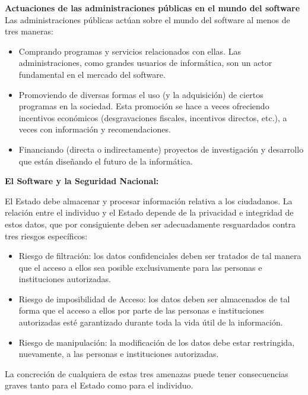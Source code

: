 {\bf Actuaciones de las administraciones públicas en el mundo del software}\newline
Las administraciones públicas actúan sobre el mundo del software al menos de tres maneras:

\begin{itemize}

\item Comprando programas y servicios relacionados con ellas. Las administraciones, como grandes usuarios de informática, son un actor fundamental en el mercado del software.

\item Promoviendo de diversas formas el uso (y la adquisición) de ciertos programas en la sociedad. Esta promoción se hace a veces ofreciendo incentivos económicos (desgravaciones fiscales, incentivos directos, etc.), a veces con información y recomendaciones.

\item Financiando (directa o indirectamente) proyectos de investigación y desarrollo que están diseñando el futuro de la informática.

\end{itemize}

{\bf El Software y la Seguridad Nacional:}\newline
 
 El Estado debe almacenar y procesar información relativa a los ciudadanos. La relación entre el individuo y el Estado depende de la privacidad e integridad de estos datos, que por consiguiente deben ser adecuadamente resguardados contra tres riesgos específicos:
 
\begin{itemize}
\item  Riesgo de filtración: los datos confidenciales deben ser tratados de tal manera que el acceso a ellos sea posible exclusivamente para las personas e instituciones autorizadas.
\item   Riesgo de imposibilidad de Acceso: los datos deben ser almacenados de tal forma que el acceso a ellos por parte de las personas e instituciones autorizadas esté garantizado durante toda la vida útil de la información.
\item Riesgo de manipulación: la modificación de los datos debe estar restringida, nuevamente, a las personas e instituciones autorizadas.
\end{itemize}
La concreción de cualquiera de estas tres amenazas puede tener consecuencias graves tanto para el Estado como para el individuo.\newline

